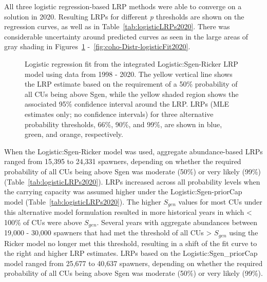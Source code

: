 \documentclass[11pt]{book}
\begin{document}
All three logistic regression-based LRP methods were able to converge on a solution in 2020. Resulting LRPs for different \emph{p} thresholds are shown on the regression curves, as well as in Table~\ref{tab:logisticLRPs2020}. There was considerable uncertainty around predicted curves as seen in the large areas of gray shading in Figures~\ref{fig:coho-IM-logisticFit2020} -~\ref{fig:coho-Distr-logisticFit2020}.
\begin{figure}[htb]

{\centering {} 

}

\caption{Logistic regression fit from the integrated Logistic:Sgen-Ricker LRP model using data from 1998 - 2020. The yellow vertical line shows the LRP estimate based on the requirement of a 50\% probability of all CUs being above Sgen, while the yellow shaded region shows the associated 95\% confidence interval around the LRP. LRPs (MLE estimates only; no confidence intervals) for three alternative probability thresholds, 66\%, 90\%, and 99\%, are shown in blue, green, and orange, respectively.}\label{fig:coho-IM-logisticFit2020}
\end{figure}
When the Logistic:Sgen-Ricker model was used, aggregate abundance-based LRPs ranged from 15,395 to 24,331 spawners, depending on whether the required probability of all CUs being above Sgen was moderate (50\%) or very likely (99\%) (Table~\ref{tab:logisticLRPs2020}). LRPs increased across all probability levels when the carrying capacity was assumed higher under the Logistic:Sgen-priorCap model (Table~\ref{tab:logisticLRPs2020}). The higher \(S_{gen}\) values for most CUs under this alternative model formulation resulted in more historical years in which \textless{} 100\% of CUs were above \(S_{gen}\). Several years with aggregate abundances between 19,000 - 30,000 spawners that had met the threshold of all CUs \textgreater{} \(S_{gen}\) using the Ricker model no longer met this threshold, resulting in a shift of the fit curve to the right and higher LRP estimates. LRPs based on the Logistic:Sgen\_priorCap model ranged from 25,677 to 40,637 spawners, depending on whether the required probability of all CUs being above Sgen was moderate (50\%) or very likely (99\%).
\end{document}

